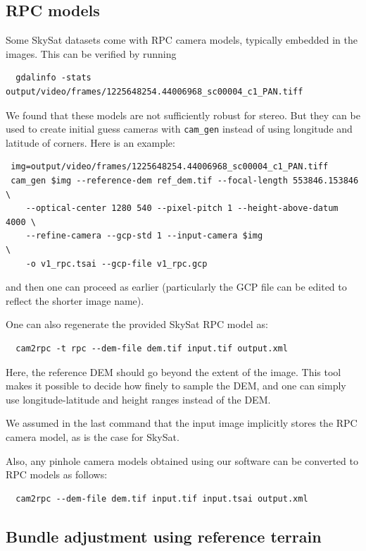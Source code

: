 \subsection{RPC models}

Some SkySat datasets come with RPC camera models, typically embedded
in the images. This can be verified by running
\begin{verbatim}
  gdalinfo -stats output/video/frames/1225648254.44006968_sc00004_c1_PAN.tiff
\end{verbatim}

We found that these models are not sufficiently
robust for stereo. But they can be used to create initial guess
cameras with \texttt{cam\_gen} instead of using longitude and latitude
of corners. Here is an example:

\begin{verbatim}
 img=output/video/frames/1225648254.44006968_sc00004_c1_PAN.tiff
 cam_gen $img --reference-dem ref_dem.tif --focal-length 553846.153846  \
    --optical-center 1280 540 --pixel-pitch 1 --height-above-datum 4000 \
    --refine-camera --gcp-std 1 --input-camera $img                     \
    -o v1_rpc.tsai --gcp-file v1_rpc.gcp
\end{verbatim}

and then one can proceed as earlier (particularly the GCP file can be edited
to reflect the shorter image name).

One can also regenerate the provided SkySat RPC model as:

\begin{verbatim}
  cam2rpc -t rpc --dem-file dem.tif input.tif output.xml
\end{verbatim}

Here, the reference DEM should go beyond the extent of the image.  This tool
makes it possible to decide how finely to sample the DEM, and one can
simply use longitude-latitude and height ranges instead of the DEM.

We assumed in the last command that the input image implicitly stores
the RPC camera model, as is the case for SkySat.

Also, any pinhole camera models obtained using our software 
can be converted to RPC models as follows:

\begin{verbatim}
  cam2rpc --dem-file dem.tif input.tif input.tsai output.xml 
\end{verbatim}

\subsection{Bundle adjustment using reference terrain}

